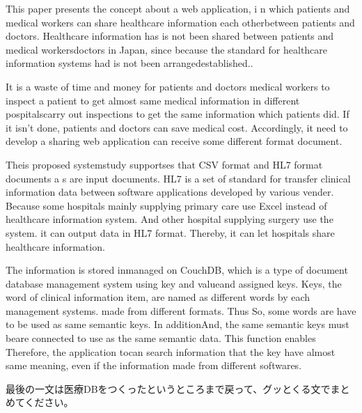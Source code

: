 This paper presents the concept about a web application, i
n which patients and medical workers can share healthcare information each otherbetween patients and doctors.
Healthcare information has is not been shared between patients and medical workersdoctors
in Japan, since
because the standard for healthcare information systems
had is not been arrangedestablished..

It is a waste of time and money for patients and doctors medical workers to inspect a patient to get almost same medical information in different pospitalscarry out inspections
to get  the same information which patients did.
If it isn't done, patients and doctors can save medical cost.
Accordingly, it need to develop a sharing web application can receive some different format document.

Theis proposed systemstudy supportses that CSV format and HL7 format documents a
s are input  documents. HL7 is a set of standard for transfer clinical information data between software applications developed by various vender.
Because some hospitals mainly supplying
primary care use Excel instead of healthcare information system.
And other hospital supplying surgery use the system.
it can output data in HL7 format.
Thereby, it can let hospitals share healthcare information.

The information is stored inmanaged on CouchDB,
which is a type of document database management system using key and valueand assigned keys.
Keys, the word of clinical information item, are named as different words by each management systems. made from different formats.
Thus So, some words are have to be used as same semantic keys.
In additionAnd, the same semantic keys must beare connected
to use as the same semantic data.
This function enables Therefore, the application tocan search information
that the key have almost same meaning, even if the information made from different softwares.


最後の一文は医療DBをつくったというところまで戻って、グッとくる文でまとめてください。
